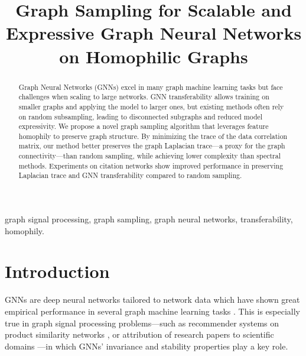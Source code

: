 \documentclass[conference]{IEEEtran}
\theoremstyle{definition}
\begin{document}
\title{Graph Sampling for Scalable and Expressive Graph Neural Networks on Homophilic Graphs}
{
\author{
}
}

\maketitle

\begin{abstract}
Graph Neural Networks (GNNs) excel in many graph machine learning tasks but face challenges when scaling to large networks. GNN transferability allows training on smaller graphs and applying the model to larger ones, but existing methods often rely on random subsampling, leading to disconnected subgraphs and reduced model expressivity. We propose a novel graph sampling algorithm that leverages feature homophily to preserve graph structure. By minimizing the trace of the data correlation matrix, our method better preserves the graph Laplacian trace---a proxy for the graph connectivity---than random sampling, while achieving lower complexity than spectral methods. Experiments on citation networks show improved performance in preserving Laplacian trace and GNN transferability compared to random sampling.
\end{abstract}

\begin{IEEEkeywords}
graph signal processing, graph sampling, graph neural networks, transferability, homophily.
\end{IEEEkeywords}

\section{Introduction}
\label{sec:intro}

GNNs are deep neural networks tailored to network data which have shown great empirical performance in several graph machine learning tasks \cite{gori2005new,kipf17-classifgcnn,defferrard17-cnngraphs,gama18-gnnarchit}. This is especially true in graph signal processing problems---such as recommender systems on product similarity networks \cite{ruiz2020gnns}, or attribution of research papers to scientific domains \cite{hamilton2017inductive}---in which GNNs' invariance and stability properties \cite{ruiz19-inv,gama19-stability} play a key role. 
\end{document}
